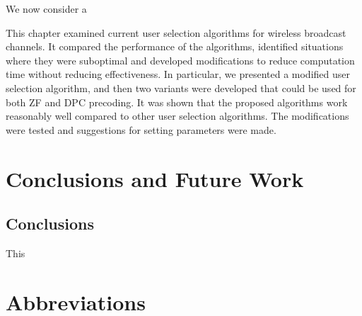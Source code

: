 \documentclass[a4paper,twoside,phd]{BYUPhys}
\begin{document}
We now consider a


This chapter examined current user selection \cite{andrews05} algorithms for wireless broadcast channels. It compared the performance of the algorithms, identified situations where they were suboptimal and developed modifications to reduce computation time without reducing effectiveness. In particular, we presented a modified user selection algorithm, and then two variants were developed that could be used for both ZF and DPC precoding. It was shown that the proposed algorithms work reasonably well compared to other user selection algorithms. The modifications were tested and suggestions for setting parameters were made.

\chapter{Conclusions and Future Work}
\label{chap:Conclusions}


\section{Conclusions}
\label{sec:ConclusionsConclusions}

This



\clearemptydoublepage
\chapter{Abbreviations}
\label{chap:abbreviations}
\end{document}
